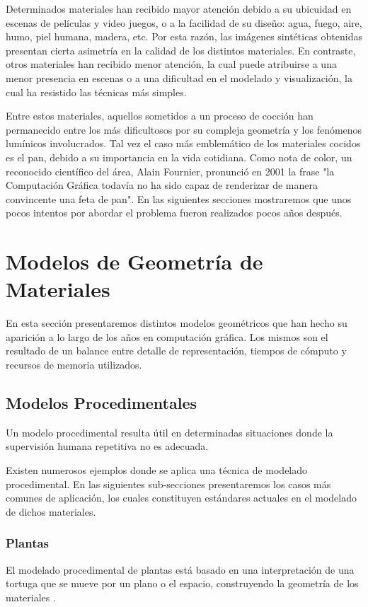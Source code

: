 Determinados materiales han recibido mayor atención debido a su ubicuidad en escenas de películas y video juegos, o a la facilidad de su diseño: agua, fuego, aire, humo, piel humana, madera, etc. Por esta razón, las imágenes sintéticas obtenidas presentan cierta asimetría en la calidad de los distintos materiales. En contraste, otros materiales han recibido menor atención, la cual puede atribuirse a una menor presencia en escenas o a una dificultad en el modelado y visualización, la cual ha resistido las técnicas más simples.

Entre estos materiales, aquellos sometidos a un proceso de cocción han permanecido entre los más dificultosos por su compleja geometría y los fenómenos lumínicos involucrados. Tal vez el caso más emblemático de los materiales cocidos es el pan, debido a su importancia en la vida cotidiana. Como nota de color, un reconocido  científico del área, Alain Fournier, pronunció en 2001 la frase "la Computación Gráfica todavía no ha sido capaz de renderizar de manera convincente una feta de pan". En las siguientes secciones mostraremos que unos pocos intentos por abordar el problema fueron realizados pocos años después.

\section{Modelos de Geometría de Materiales}
En esta sección presentaremos distintos modelos geométricos que han hecho su aparición a lo largo de los años en computación gráfica. Los mismos son el resultado de un balance entre detalle de representación, tiempos de cómputo y recursos de memoria utilizados.

\subsection{Modelos Procedimentales}
Un modelo procedimental resulta útil en determinadas situaciones donde la supervisión humana repetitiva no es adecuada.

Existen numerosos ejemplos donde se aplica una técnica de modelado procedimental.
En las siguientes sub-secciones presentaremos los casos más comunes de aplicación, los cuales constituyen estándares actuales en el modelado de dichos materiales.


\subsubsection{Plantas}
El modelado procedimental de plantas está basado en una interpretación de una tortuga que se mueve por un plano o el espacio, construyendo la geometría de los materiales \cite{Prusinkiewicz1986}.

